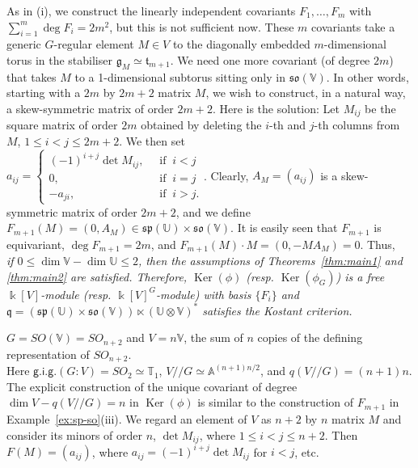 \begin{ex}
As in (i), we construct the linearly independent covariants $F_1,\dots,F_m$ with 
$\sum_{i=1}^m\deg F_i=2m^2$, but this is not 
sufficient now. These $m$ covariants take a generic $G$-regular element $M\in V$ to the diagonally 
embedded $m$-dimensional torus in the stabiliser ${{\mathfrak g}}_M\simeq {{\mathfrak t}}_{m+1}$.
We need one more covariant (of degree $2m$) that takes $M$ to a 1-dimensional subtorus sitting 
only in $\mathfrak{so}({{\mathbb V}})$. In other words, starting with a $2m$ by $2m+2$ matrix $M$, we wish 
to construct, in a natural way, a skew-symmetric matrix of order $2m+2$. Here is the solution:
Let $M_{ij}$ be the square matrix of order $2m$ obtained by deleting the $i$-th and $j$-th columns 
from $M$, $1{\leqslant} i<j{\leqslant} 2m+2$. 
We then set 
\\
$a_{ij}=\begin{cases}   (-1)^{i+j}\det M_{ij}, &  \ \text{ if } \ i<j \\
0, &  \ \text{ if } \ i=j \\
-a_{ji}, &  \ \text{ if } \ i>j .
\end{cases}$.  Clearly, $A_M=(a_{ij})$ is a skew-symmetric matrix of order $2m+2$, and we define
$F_{m+1}(M)=(0, A_M)\in \mathfrak{sp}({{\mathbb U}})\times \mathfrak{so}({{\mathbb V}})$. It is easily seen that $F_{m+1}$ is equivariant, $\deg F_{m+1}=2m$, and 
$F_{m+1}(M){\cdot}M=(0,-MA_M)=0$. 
Thus, 
\\ \indent 
{\sl if\/ $0{\leqslant} \dim{{\mathbb V}}-\dim{{\mathbb U}}{\leqslant} 2$, then 
the assumptions of Theorems~\ref{thm:main1} and \ref{thm:main2} 
are satisfied. Therefore, ${\operatorname{Ker}}(\phi)$ (resp. ${\operatorname{Ker}}(\phi_G)$) is a free ${\Bbbk}[V]$-module (resp. ${\Bbbk}[V]^G$-module) with basis $\{F_i\}$ and
${{\mathfrak q}}=(\mathfrak{sp}({{\mathbb U}})\times \mathfrak{so}({{\mathbb V}}))\ltimes ({{\mathbb U}}\otimes {{\mathbb V}})^*$
satisfies
the Kostant criterion.}
\end{ex}  

\begin{ex}   \label{ex:so-mnogo}
$G=SO({{\mathbb V}})=SO_{n+2}$ and $V=n{{\mathbb V}}$, the sum of $n$ copies of the defining representation of 
$SO_{n+2}$. 
\\ \indent
Here ${\mathsf{g.i.g.}}(G:V)=SO_2\simeq {{\mathbb T}}_1$,
$V{/\!\!/} G\simeq \mathbb A^{(n+1)n/2}$, and $q(V{/\!\!/} G)=(n+1)n$. 
The explicit construction of the unique covariant of degree $\dim V-q(V{/\!\!/} G)=n$ in 
${\operatorname{Ker}}(\phi)$ is similar to the construction of $F_{m+1}$ in Example~\ref{ex:sp-so}(iii).
We regard an element of $V$ as $n+2$ by $n$ matrix $M$ and consider its minors of order $n$,  
$\det M_{ij}$, where $1{\leqslant} i< j{\leqslant} n+2$. Then $F(M)=(a_{ij})$, where $a_{ij}=(-1)^{i+j}\det M_{ij}$ for 
$i<j$, etc. 
\end{ex}

